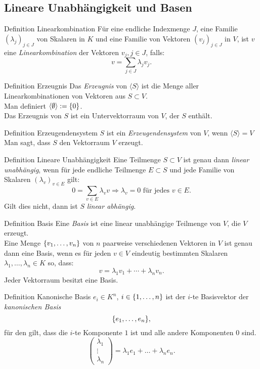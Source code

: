 \documentclass[main.tex]{subfiles}
\begin{document}
\subsection*{Lineare Unabhängigkeit und Basen}
\begin{karte}{Definition Linearkombination}
    Für eine endliche Indexmenge \(J\), eine Familie 
    \( {(\lambda_j)}_{j \in J} \) von Skalaren in 
    \(K\) und eine Familie von Vektoren 
    \( {(v_j)}_{j \in J} \) in \(V\), ist \(v\) eine 
    \textit{Linearkombination} der Vektoren \(v_j, j \in J\), falls: 
    \[v = \sum_{j \in J} \lambda_j v_j. \]
\end{karte}
\begin{karte}{Definition Erzeugnis}
    Das \textit{Erzeugnis} von \(\langle S \rangle \) ist die Menge 
    aller Linearkombinationen von Vektoren aus \(S \subset V\). \\
    Man definiert \(\langle \emptyset \rangle : = \{0\}\). \\
    Das Erzeugnis von \(S\) ist ein Untervektorraum von \(V\), 
    der \(S\) enthält.
\end{karte}
\begin{karte}{Definition Erzeugendensystem}
    \(S\) ist ein \textit{Erzeugendensystem} von \(V\), wenn \(\langle S \rangle = V\) \\
    Man sagt, dass \(S\) den Vektorraum \(V\) erzeugt.
\end{karte}
\begin{karte}{Definition Lineare Unabhängigkeit}
    Eine Teilmenge \(S \subset V\) ist genau dann \textit{linear unabhängig},
    wenn für jede endliche Teilmenge \(E \subset S\) 
    und jede Familie von Skalaren \( {(\lambda_v)}_{v \in E}\) gilt: 
    \[ 0 = \sum_{v \in E} \lambda_v v \Rightarrow \lambda_v = 0 
    \text{ für jedes } v \in E. \]
    Gilt dies nicht, dann ist \(S\) \textit{linear abhängig}.
\end{karte}
\begin{karte}{Definition Basis}
    Eine \textit{Basis} ist eine linear unabhängige Teilmenge von \(V\), die
    \(V\) erzeugt. \\
    Eine Menge \(\{v_1, \ldots ,v_n\}\) von \(n\) paarweise verschiedenen 
    Vektoren in \(V\) ist genau dann eine Basis, wenn es für jeden \(v \in V\)
    eindeutig bestimmten Skalaren \(\lambda_1, \ldots , \lambda_n \in K\)
    so, dass: 
    \[v = \lambda_1 v_1 + \cdots + \lambda_n v_n.\]
    Jeder Vektorraum besitzt eine Basis. 
\end{karte}
\begin{karte}{Definition Kanonische Basis}
    \(e_i \in K^n\), \(i \in \{1, \ldots, n\}\) ist der 
    \(i\)-te Basisvektor der \textit{kanonischen Basis}
    \[ \{e_1, \ldots,e_n\}, \] für den gilt, dass die 
    \(i\)-te Komponente \(1\) ist und alle andere 
    Komponenten \(0\) sind.
    \[ \left(
        \begin{array}{c}
        \lambda_1 \\
        \vdots \\
        \lambda_n
        \end{array}
        \right) = \lambda_1 e_1 + \ldots + \lambda_n e_n. \]
\end{karte}
\end{document}
